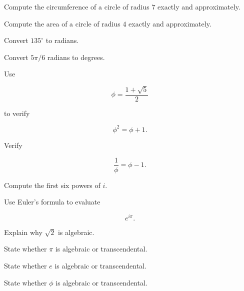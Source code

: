 \begin{exercise}[2]
Compute the circumference of a circle of radius \(7\) exactly and
approximately.
\end{exercise}

\begin{exercise}[2]
Compute the area of a circle of radius \(4\) exactly and approximately.
\end{exercise}

\begin{exercise}[2]
Convert \(135^\circ\) to radians.
\end{exercise}

\begin{exercise}[2]
Convert \(5\pi/6\) radians to degrees.
\end{exercise}

\begin{exercise}[2]
Use

\[
\phi
=
\frac{1+\sqrt5}{2}
\]

to verify

\[
\phi^2=\phi+1.
\]
\end{exercise}

\begin{exercise}[2]
Verify

\[
\frac1\phi
=
\phi-1.
\]
\end{exercise}

\begin{exercise}[2]
Compute the first six powers of \(i\).
\end{exercise}

\begin{exercise}[2]
Use Euler's formula to evaluate

\[
e^{i\pi}.
\]
\end{exercise}

\begin{exercise}[2]
Explain why \(\sqrt2\) is algebraic.
\end{exercise}

\begin{exercise}[2]
State whether \(\pi\) is algebraic or transcendental.
\end{exercise}

\begin{exercise}[2]
State whether \(e\) is algebraic or transcendental.
\end{exercise}

\begin{exercise}[2]
State whether \(\phi\) is algebraic or transcendental.
\end{exercise}

